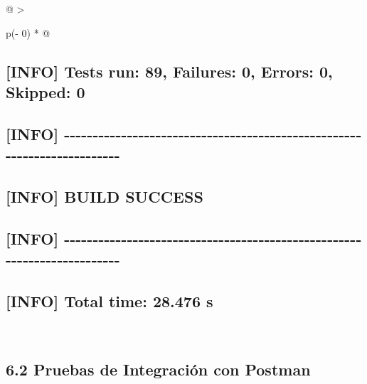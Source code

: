 \documentclass[
]{article}
\begin{document}
\begin{longtable}[]{@{}
  >{\raggedright\arraybackslash}p{(\columnwidth - 0\tabcolsep) * }@{}}
\begin{minipage}[b]{\linewidth}
\subsection{{[}INFO{]} Tests run: 89, Failures: 0, Errors: 0, Skipped:
0}

\subsection{{[}INFO{]}
-\/-\/-\/-\/-\/-\/-\/-\/-\/-\/-\/-\/-\/-\/-\/-\/-\/-\/-\/-\/-\/-\/-\/-\/-\/-\/-\/-\/-\/-\/-\/-\/-\/-\/-\/-\/-\/-\/-\/-\/-\/-\/-\/-\/-\/-\/-\/-\/-\/-\/-\/-\/-\/-\/-\/-\/-\/-\/-\/-\/-\/-\/-\/-\/-\/-\/-\/-\/-\/-\/-\/-}

\subsection{{[}INFO{]} BUILD SUCCESS}

\subsection{{[}INFO{]}
-\/-\/-\/-\/-\/-\/-\/-\/-\/-\/-\/-\/-\/-\/-\/-\/-\/-\/-\/-\/-\/-\/-\/-\/-\/-\/-\/-\/-\/-\/-\/-\/-\/-\/-\/-\/-\/-\/-\/-\/-\/-\/-\/-\/-\/-\/-\/-\/-\/-\/-\/-\/-\/-\/-\/-\/-\/-\/-\/-\/-\/-\/-\/-\/-\/-\/-\/-\/-\/-\/-\/-}

\subsection{{[}INFO{]} Total time: 28.476
s}
\end{minipage} \\
\midrule\noalign{}
\endhead
\bottomrule\noalign{}
\endlastfoot
\end{longtable}

\subsection{}

\subsection{6.2 Pruebas de Integración con
Postman}
\end{document}
